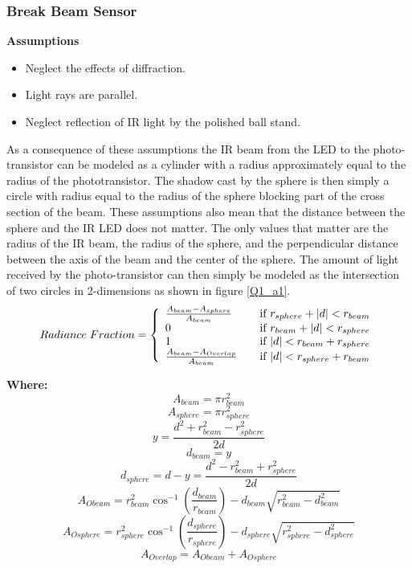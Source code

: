 \documentclass{article}
\theoremstyle{plain}
\theoremstyle{definition}
\theoremstyle{remark}
\begin{document}
\subsubsection*{Break Beam Sensor}

\textbf{Assumptions} 
\begin{itemize}
\item Neglect the effects of diffraction.
\item Light rays are parallel. 
\item Neglect reflection of IR light by the polished ball stand.
\end{itemize}
As a consequence of these assumptions the IR beam from the LED to the photo-transistor can be modeled as a cylinder with a radius approximately equal to the radius of the phototransistor.  The shadow cast by the sphere is then simply a circle with radius equal to the radius of the sphere blocking part of the cross section of the beam.  These assumptions also mean that the distance between the sphere and the IR LED does not matter.  The only values that matter are the radius of the IR beam, the radius of the sphere, and the perpendicular distance between the axis of the beam and the center of the sphere.  The amount of light received by the photo-transistor can then simply be modeled as the intersection of two circles in 2-dimensions as shown in figure \ref{Q1_a1}. \\

\[
  Radiance \hspace{0.1cm} Fraction = \left\{
  \begin{array}{l l}
    \frac{A_{beam} - A_{sphere}}{A_{beam}} & \quad \text{if } r_{sphere} + |d| < r_{beam} \\
    0 & \quad \text{if } r_{beam} + |d| < r_{sphere} \\
    1 & \quad \text{if } |d| < r_{beam} + r_{sphere} \\
    \frac{A_{beam} - A_{Overlap}}{A_{beam}} & \quad \text{if } |d| < r_{sphere} + r_{beam} \\
  \end{array} \right.
\]

\textbf{Where:}
$$ A_{beam} = \pi r_{beam}^2$$
$$A_{sphere} = \pi r_{sphere}^2 $$ 
$$ y = \frac{d^2+r_{beam}^2-r_{sphere}^2}{2d}$$
$$ d_{beam}=y$$
$$ d_{sphere}=d-y=\frac{d^2-r_{beam}^2+r_{sphere}^2}{2d} $$
$$ A_{Obeam} = r_{beam}^2 \cos^{-1} (\frac{d_{beam}}{r_{beam}})-d_{beam} \sqrt{r_{beam}^2-d_{beam}^2}$$ 
$$ A_{Osphere} = r_{sphere}^2 \cos^{-1} (\frac{d_{sphere}}{r_{sphere}})-d_{sphere} \sqrt{r_{sphere}^2-d_{sphere}^2}$$
$$ A_{Overlap} = A_{Obeam} + A_{Osphere} $$
\end{document}
